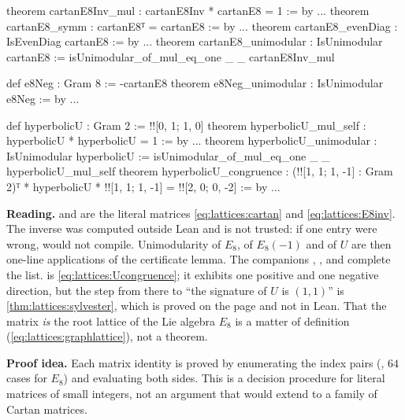 \begin{leanbox}
\begin{leancode}
theorem cartanE8Inv_mul : cartanE8Inv * cartanE8 = 1 := by ...
theorem cartanE8_symm : cartanE8ᵀ = cartanE8 := by ...
theorem cartanE8_evenDiag : IsEvenDiag cartanE8 := by ...
theorem cartanE8_unimodular : IsUnimodular cartanE8 :=
  isUnimodular_of_mul_eq_one _ _ cartanE8Inv_mul

def e8Neg : Gram 8 := -cartanE8
theorem e8Neg_unimodular : IsUnimodular e8Neg := by ...

def hyperbolicU : Gram 2 := !![0, 1; 1, 0]
theorem hyperbolicU_mul_self : hyperbolicU * hyperbolicU = 1 := by ...
theorem hyperbolicU_unimodular : IsUnimodular hyperbolicU :=
  isUnimodular_of_mul_eq_one _ _ hyperbolicU_mul_self
theorem hyperbolicU_congruence :
    (!![1, 1; 1, -1] : Gram 2)ᵀ * hyperbolicU * !![1, 1; 1, -1]
      = !![2, 0; 0, -2] := by ...
\end{leancode}
\textbf{Reading.}  and  are the literal matrices
\eqref{eq:lattices:cartan} and \eqref{eq:lattices:E8inv}. The inverse was computed outside
Lean and is not trusted: if one entry were wrong,  would not compile.
Unimodularity of $E_8$, of $E_8(-1)$ and of $U$ are then one-line applications of the
certificate lemma. The companions , ,
 and  complete the list.
 is \eqref{eq:lattices:Ucongruence}; it exhibits one positive
and one negative direction, but the step from there to ``the signature of $U$ is $(1,1)$''
is \cref{thm:lattices:sylvester}, which is proved on the page and not in Lean. That the
matrix  \emph{is} the root lattice of the Lie algebra $E_8$ is a matter of
definition (\cref{eq:lattices:graphlattice}), not a theorem.

\textbf{Proof idea.} Each matrix identity is proved by enumerating the index pairs
(, $64$ cases for $E_8$) and evaluating both sides. This
is a decision procedure for literal matrices of small integers, not an argument that would
extend to a family of Cartan matrices.
\end{leanbox}

